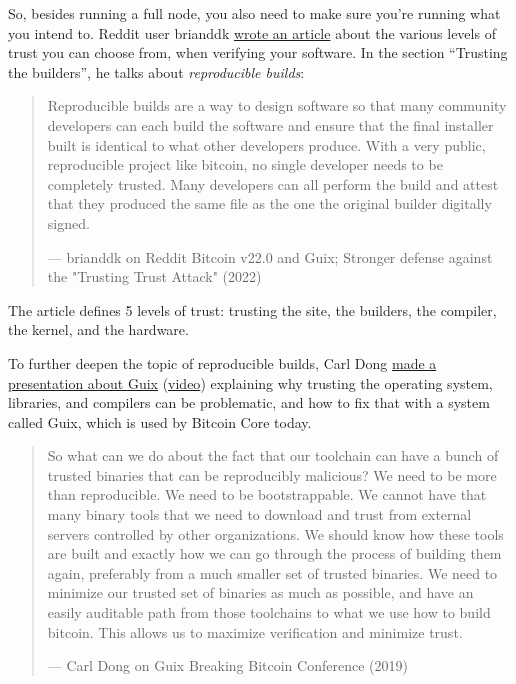 So, besides running a full node, you also need to make sure you're
running what you intend to. Reddit user brianddk
\href{https://www.reddit.com/r/Bitcoin/comments/smj1ep/bitcoin_v220_and_guix_stronger_defense_against/}{wrote
an article} about the various levels of trust you can choose from, when
verifying your software. In the section ``Trusting the builders'', he
talks about \emph{reproducible builds}:

\begin{quote}
Reproducible builds are a way to design software so that many community
developers can each build the software and ensure that the final
installer built is identical to what other developers produce. With a
very public, reproducible project like bitcoin, no single developer
needs to be completely trusted. Many developers can all perform the
build and attest that they produced the same file as the one the
original builder digitally signed.

---  brianddk on Reddit Bitcoin v22.0 and Guix; Stronger defense against
the "Trusting Trust Attack" (2022)
\end{quote}

The article defines 5 levels of trust: trusting the site, the builders,
the compiler, the kernel, and the hardware.

To further deepen the topic of reproducible builds, Carl Dong
\href{https://btctranscripts.com/breaking-bitcoin/2019/bitcoin-build-system/}{made
a presentation about Guix}
(\href{https://www.youtube.com/watch?v=I2iShmUTEl8}{video}) explaining
why trusting the operating system, libraries, and compilers can be
problematic, and how to fix that with a system called Guix, which is
used by Bitcoin Core today.

\begin{quote}
So what can we do about the fact that our toolchain can have a bunch of
trusted binaries that can be reproducibly malicious? We need to be more
than reproducible. We need to be bootstrappable. We cannot have that
many binary tools that we need to download and trust from external
servers controlled by other organizations. We should know how these
tools are built and exactly how we can go through the process of
building them again, preferably from a much smaller set of trusted
binaries. We need to minimize our trusted set of binaries as much as
possible, and have an easily auditable path from those toolchains to
what we use how to build bitcoin. This allows us to maximize
verification and minimize trust.

---  Carl Dong on Guix Breaking Bitcoin Conference (2019)
\end{quote}


